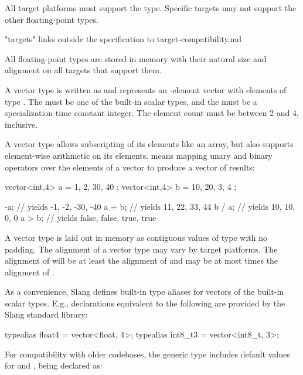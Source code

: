 All target platforms must support the  type.
Specific targets may not support the other floating-point types.
\begin{TODO}
"targets" links outside the specification to target-compatibility.md
\end{TODO}

All floating-point types are stored in memory with their natural size and alignment on all targets that support them.


A vector type is written as  and represents an -element vector with elements of type .
The   must be one of the built-in scalar types, and the   must be a specialization-time constant integer.
The element count must be between 2 and 4, inclusive.

A vector type allows subscripting of its elements like an array, but also supports element-wise arithmetic on its elements.
 means mapping unary and binary operators over the elements of a vector to produce a vector of results:

\begin{codeblock}
vector<int,4> a = { 1, 2, 30, 40 };
vector<int,4> b = { 10, 20, 3, 4 };

-a; // yields { -1, -2, -30, -40 }
a + b; // yields { 11, 22, 33, 44 }
b / a; // yields { 10, 10, 0, 0 }
a > b; // yields { false, false, true, true }
\end{codeblock}

A vector type is laid out in memory as  contiguous values of type  with no padding.
The alignment of a vector type may vary by target platforms.
The alignment of  will be at least the alignment of  and may be at most  times the alignment of .

As a convenience, Slang defines built-in type aliases for vectors of the built-in scalar types.
E.g., declarations equivalent to the following are provided by the Slang standard library:

\begin{codeblock}
typealias float4 = vector<float, 4>;
typealias int8_t3 = vector<int8_t, 3>;
\end{codeblock}


For compatibility with older codebases, the generic  type includes default values for  and , being declared as:

